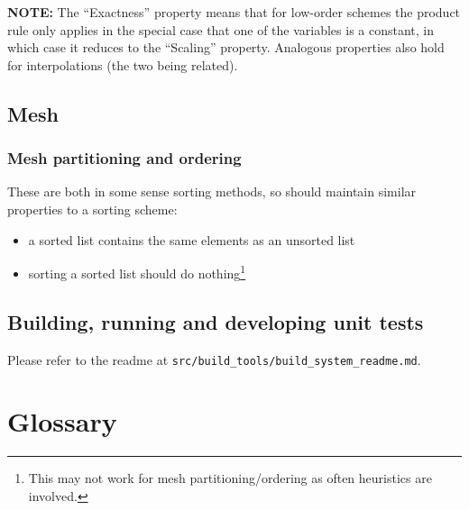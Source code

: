 \documentclass[11pt]{report}
\begin{document}
\textbf{NOTE:} The ``Exactness'' property means that for low-order schemes the product rule only applies
in the special case that one of the variables is a constant, in which case it reduces to the
``Scaling'' property.
Analogous properties also hold for interpolations (the two being related).

\section{Mesh}

\subsection{Mesh partitioning and ordering}

These are both in some sense sorting methods, so should maintain similar properties to a sorting
scheme:
\begin{itemize}
\item a sorted list contains the same elements as an unsorted list
\item sorting a sorted list should do nothing\footnote{This may not work for mesh
    partitioning/ordering as often heuristics are involved.}
\end{itemize}

\section{Building, running and developing unit tests}
\label{sec:build-runn-unit}

Please refer to the readme at \texttt{src/build\_tools/build\_system\_readme.md}. 

\appendix

\chapter{Glossary}
\end{document}
